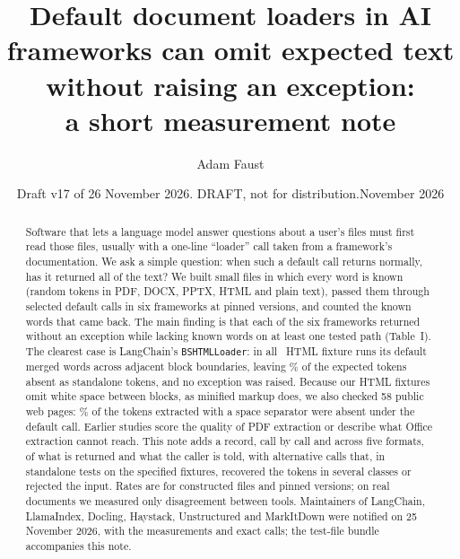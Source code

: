 \documentclass[aps,pre,twocolumn,superscriptaddress,nofootinbib,10pt]{revtex4-2}
\begin{document}
\linespread{0.975}\selectfont

\title{Default document loaders in AI frameworks can omit expected text without raising an exception:\\ a short measurement note}

\author{Adam Faust}
\date{\ifdraftmode Draft v17 of 26 November 2026. DRAFT, not for distribution.\else November 2026\fi}

\begin{abstract}
Software that lets a language model answer questions about a user's files must first read those files, usually with a one-line ``loader'' call taken from a framework's documentation. We ask a simple question: when such a default call returns normally, has it returned all of the text? We built small files in which every word is known (random tokens in PDF, DOCX, PPTX, HTML and plain text), passed them through selected default calls in six frameworks at pinned versions, and counted the known words that came back. The main finding is that each of the six frameworks returned without an exception while lacking known words on at least one tested path (Table~I). The clearest case is LangChain's \texttt{BSHTMLLoader}: in all \lcHtmlRuns\ HTML fixture runs its default merged words across adjacent block boundaries, leaving \lcHtmlLossPct\% of the expected tokens absent as standalone tokens, and no exception was raised. Because our HTML fixtures omit white space between blocks, as minified markup does, we also checked 58 public web pages: \glueRealPct\% of the tokens extracted with a space separator were absent under the default call. Earlier studies score the quality of PDF extraction or describe what Office extraction cannot reach. This note adds a record, call by call and across five formats, of what is returned and what the caller is told, with alternative calls that, in standalone tests on the specified fixtures, recovered the tokens in several classes or rejected the input. Rates are for constructed files and pinned versions; on real documents we measured only disagreement between tools. Maintainers of LangChain, LlamaIndex, Docling, Haystack, Unstructured and MarkItDown were notified on 25 November 2026, with the measurements and exact calls; the test-file bundle accompanies this note.
\end{abstract}

\maketitle
\end{document}
